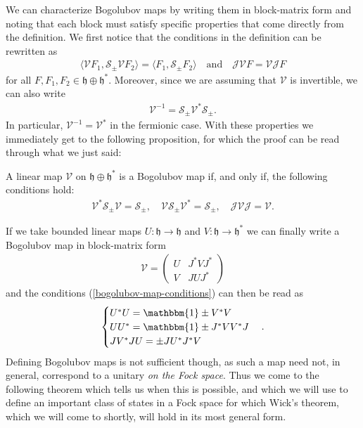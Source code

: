 We can characterize Bogolubov maps by writing them in block-matrix form and noting that each
block must satisfy specific properties that come directly from the definition. We first notice
that the conditions in the definition can be rewritten as
\begin{align*}
	\langle \mathcal{V}F_1,\mathcal{S}_\pm\mathcal{V}F_2\rangle
	= \langle F_1,\mathcal{S}_\pm F_2\rangle
	\quad\text{and}\quad\mathcal{JV}F=\mathcal{VJ}F
\end{align*}
for all $F,F_1,F_2\in\mathfrak{h}\oplus\mathfrak{h}^*$. Moreover, since we are assuming that
$\mathcal{V}$ is invertible, we can also write
\begin{align*}
	\mathcal{V}^{-1} = \mathcal{S}_\pm\mathcal{V}^*\mathcal{S}_\pm.
\end{align*}
In particular, $\mathcal{V}^{-1}=\mathcal{V}^*$ in the fermionic case. With these properties
we immediately get to the following proposition, for which the proof can be read through what
we just said:
\begin{proposition}
	A linear map $\mathcal{V}$ on $\mathfrak{h}\oplus\mathfrak{h}^*$ is a Bogolubov map if,
	and only if, the following conditions hold:
	\begin{align}
		\label{bogolubov-map-conditions}
		\mathcal{V}^*\mathcal{S}_\pm\mathcal{V} = \mathcal{S}_\pm ,\quad
		\mathcal{VS}_\pm\mathcal{V}^* = \mathcal{S}_\pm ,\quad
		\mathcal{JVJ} = \mathcal{V}.
	\end{align}
\end{proposition}

If we take bounded linear maps $U:\mathfrak{h}\to\mathfrak{h}$ and $V:\mathfrak{h}\to\mathfrak{h}^*$
we can finally write a Bogolubov map in block-matrix form
\begin{align}
	\label{bogolubov-block-matrix}
	\mathcal{V} = \begin{pmatrix} U & J^* V J^* \\ V & JUJ^* \end{pmatrix}
\end{align}
and the conditions (\ref{bogolubov-map-conditions}) can then be read as
\begin{align*}
	\begin{cases}
		U^*U = \mathbbm{1} \pm V^*V \\
		UU^* = \mathbbm{1} \pm J^*VV^*J \\
		JV^*JU = \pm JU^*J^*V
	\end{cases}.
\end{align*}
Defining Bogolubov maps is not sufficient though, as such a map need not, in general,
correspond to a unitary \textit{on the Fock space}. Thus we come to the following theorem
which tells us when this is possible, and which we will use to define an important class of
states in a Fock space for which Wick's theorem, which we will come to shortly, will hold in
its most general form.

